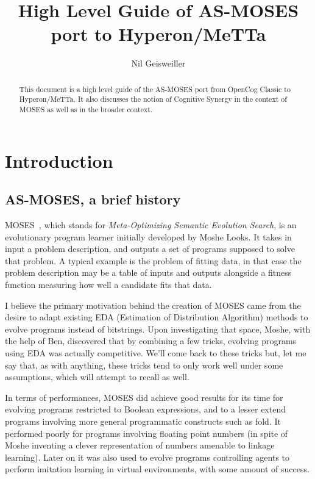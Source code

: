 \documentclass[]{report}
\begin{document}
\title{High Level Guide of AS-MOSES port to Hyperon/MeTTa}
\author{Nil Geisweiller}
\maketitle

\begin{abstract}
This document is a high level guide of the AS-MOSES port from OpenCog
Classic to Hyperon/MeTTa.  It also discusses the notion of Cognitive
Synergy in the context of MOSES as well as in the broader context.
\end{abstract}

\tableofcontents

\chapter{Introduction}

\section{AS-MOSES, a brief history}

MOSES~\cite{Looks06abstractcompetent}, which stands
for \emph{Meta-Optimizing Semantic Evolution Search}, is an
evolutionary program learner initially developed by Moshe Looks.  It
takes in input a problem description, and outputs a set of programs
supposed to solve that problem.  A typical example is the problem of
fitting data, in that case the problem description may be a table of
inputs and outputs alongside a fitness function measuring how well a
candidate fits that data.

I believe the primary motivation behind the creation of MOSES came
from the desire to adapt existing EDA (Estimation of Distribution
Algorithm) methods to evolve programs instead of bitstrings.  Upon
investigating that space, Moshe, with the help of Ben, discovered that
by combining a few tricks, evolving programs using EDA was actually
competitive.  We'll come back to these tricks but, let me say that, as
with anything, these tricks tend to only work well under some
assumptions, which will attempt to recall as well.

In terms of performances, MOSES did achieve good results for its time
for evolving programs restricted to Boolean expressions, and to a
lesser extend programs involving more general programmatic constructs
such as fold.  It performed poorly for programs involving floating
point numbers (in spite of Moshe inventing a clever representation of
numbers amenable to linkage learning).  Later on it was also used to
evolve programs controlling agents to perform imitation learning in
virtual environments, with some amount of success.
\end{document}

